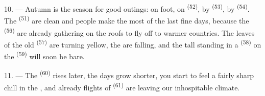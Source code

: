 10. --- Autumn is the season for good outings: on foot, on
 \textsuperscript{(52)}, by  \textsuperscript{(53)}, by
 \textsuperscript{(54)}. The  \textsuperscript{(51)} are clean and
people make the most of the last fine days, because the
 \textsuperscript{(56)} are already gathering on the roofs to fly off to
warmer countries. The leaves of the old  \textsuperscript{(57)} are
turning yellow, the  are falling, and the tall
 standing in a  \textsuperscript{(58)} on the
 \textsuperscript{(59)} will soon be bare.

11. --- The  \textsuperscript{(60)} rises later, the days grow shorter, you start
to feel a fairly sharp chill in the , and already flights of 
\textsuperscript{(61)} are leaving our inhospitable climate.
\VUsaut{6.0mm}
\VUfilet{22mm}
